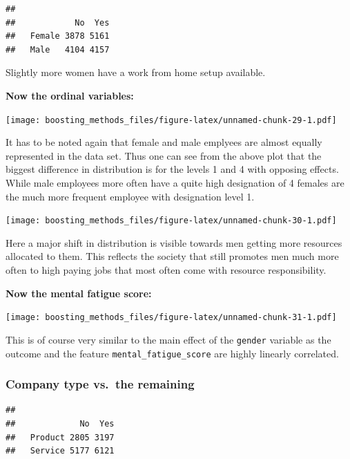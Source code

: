 \documentclass[
]{book}
\newenvironment{Shaded}{\begin{snugshade}}{\end{snugshade}}
\newcommand{\CommentTok}[1]{\textcolor[rgb]{0.56,0.35,0.01}{\textit{#1}}}
\newcommand{\FunctionTok}[1]{\textcolor[rgb]{0.00,0.00,0.00}{#1}}
\newcommand{\NormalTok}[1]{#1}
\newcommand{\SpecialCharTok}[1]{\textcolor[rgb]{0.00,0.00,0.00}{#1}}
\begin{document}
\begin{verbatim}
##         
##            No  Yes
##   Female 3878 5161
##   Male   4104 4157
\end{verbatim}

Slightly more women have a work from home setup available.

\textbf{Now the ordinal variables:}

\texttt{[image: boosting\_methods\_files/figure-latex/unnamed-chunk-29-1.pdf]}

It has to be noted again that female and male emplyees are almost equally represented in the data set. Thus one can see from the above plot that the biggest difference in distribution is for the levels 1 and 4 with opposing effects. While male employees more often have a quite high designation of 4 females are the much more frequent employee with designation level 1.

\texttt{[image: boosting\_methods\_files/figure-latex/unnamed-chunk-30-1.pdf]}

Here a major shift in distribution is visible towards men getting more resources allocated to them. This reflects the society that still promotes men much more often to high paying jobs that most often come with resource responsibility.

\textbf{Now the mental fatigue score:}

\texttt{[image: boosting\_methods\_files/figure-latex/unnamed-chunk-31-1.pdf]}

This is of course very similar to the main effect of the \texttt{gender} variable as the outcome and the feature \texttt{mental\_fatigue\_score} are highly linearly correlated.

\hypertarget{company-type-vs.-the-remaining}{%
\subsubsection{Company type vs.~the remaining}\label{company-type-vs.-the-remaining}}

\begin{Shaded}
\end{Shaded}

\begin{verbatim}
##          
##             No  Yes
##   Product 2805 3197
##   Service 5177 6121
\end{verbatim}
\end{document}
